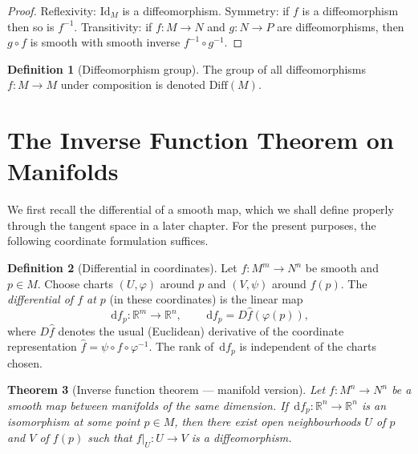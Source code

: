 \documentclass[12pt,a4paper,openany]{book}
\newtheorem{theorem}{Theorem}[section]
\theoremstyle{definition}
\newtheorem{definition}[theorem]{Definition}
\theoremstyle{remark}
\newcommand{\R}{\mathbb{R}}
\newcommand{\Id}{\mathrm{Id}}
\newcommand{\Diff}{\mathrm{Diff}}
\newcommand{\dd}{\,\mathrm{d}}
\begin{document}
\begin{proof}
Reflexivity: $\Id_M$ is a diffeomorphism.  Symmetry: if $f$ is a
diffeomorphism then so is $f^{-1}$.  Transitivity: if $f \colon M \to N$
and $g \colon N \to P$ are diffeomorphisms, then $g \circ f$ is smooth
with smooth inverse $f^{-1} \circ g^{-1}$.
\end{proof}

\begin{definition}[Diffeomorphism group]\label{def:Diff-group}
The group of all diffeomorphisms $f \colon M \to M$ under composition is
denoted $\Diff(M)$.
\end{definition}

\section{The Inverse Function Theorem on Manifolds}
\label{sec:inverse-function-thm}

We first recall the differential of a smooth map, which we shall define
properly through the tangent space in a later chapter.  For the present
purposes, the following coordinate formulation suffices.

\begin{definition}[Differential in coordinates]\label{def:differential-coords}
Let $f \colon M^m \to N^n$ be smooth and $p \in M$.  Choose charts
$(U,\varphi)$ around $p$ and $(V,\psi)$ around $f(p)$.  The
\emph{differential of $f$ at $p$} (in these coordinates) is the linear map
\[
  \dd f_p \colon \R^m \longrightarrow \R^n, \qquad
  \dd f_p = D\hat{f}(\varphi(p)),
\]
where $D\hat{f}$ denotes the usual (Euclidean) derivative of the coordinate
representation $\hat{f} = \psi \circ f \circ \varphi^{-1}$.  The rank of
$\dd f_p$ is independent of the charts chosen.
\end{definition}

\begin{theorem}[Inverse function theorem --- manifold version]
\label{thm:inverse-function}
Let $f \colon M^n \to N^n$ be a smooth map between manifolds of the same
dimension.  If $\dd f_p \colon \R^n \to \R^n$ is an isomorphism at some
point $p \in M$, then there exist open neighbourhoods $U$ of $p$ and $V$ of
$f(p)$ such that $f|_U \colon U \to V$ is a diffeomorphism.
\end{theorem}
\end{document}
